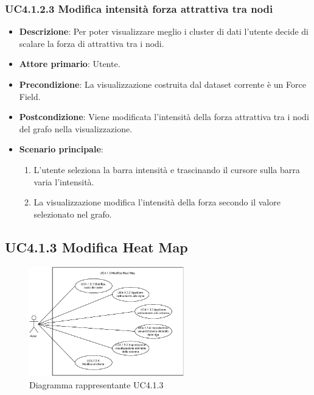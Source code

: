 \subsubsection{UC4.1.2.3 Modifica intensità forza attrattiva tra nodi}
\label{subsec:uc4.1.2.3}
\begin{itemize}
    \item \textbf{Descrizione}: Per poter visualizzare meglio i cluster di dati l’utente 
                                decide di scalare la forza di attrattiva tra i nodi.

	
    \item \textbf{Attore primario}: Utente.
    
    \item \textbf{Precondizione}:   La visualizzazione costruita dal dataset corrente è un Force Field.
    \item \textbf{Postcondizione}:  Viene modificata l'intensità della forza attrattiva tra i nodi del grafo nella visualizzazione.

	\item \textbf{Scenario principale}:
        \begin{enumerate}
            \item L'utente seleziona la barra intensità e trascinando il cursore sulla barra varia l’intensità.
            \item La visualizzazione modifica l'intensità della forza secondo il valore selezionato nel grafo.
        \end{enumerate}
\end{itemize}


%
\newpage
\subsection{UC4.1.3 Modifica Heat Map}
\label{subsec:uc4.1.3}
\begin{figure}[h]
    \centering
    \includegraphics[width=0.6\textwidth]{componenti/casi-duso/diagrammi/UC4.1.3.pdf}
    \caption{Diagramma rappresentante UC4.1.3}
    \label{fig:UC2}
\end{figure}


